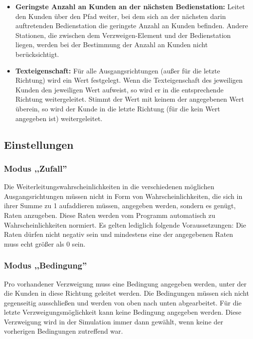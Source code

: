 \begin{itemize}
  \item 
    \textbf{Geringste Anzahl an Kunden an der nächsten Bedienstation:}
    Leitet den Kunden über den Pfad weiter, bei dem sich an der nächsten
    darin auftretenden Bedienstation die geringste Anzahl an Kunden befinden.
    Andere Stationen, die zwischen dem Verzweigen-Element und der
    Bedienstation liegen, werden bei der Bestimmung der Anzahl an Kunden
    nicht berücksichtigt.

  \item 
    \textbf{Texteigenschaft:}
    Für alle Ausgangsrichtungen (außer für die letzte Richtung) wird ein Wert festgelegt.
    Wenn die Texteigenschaft des jeweiligen Kunden den jeweiligen Wert aufweist,
    so wird er in die entsprechende Richtung weitergeleitet.
    Stimmt der Wert mit keinem der angegebenen Wert überein,
    so wird der Kunde in die letzte Richtung (für die kein Wert angegeben ist) weitergeleitet.

\end{itemize}

\subsection*{Einstellungen}

\subsubsection*{Modus ,,Zufall''}

Die Weiterleitungswahrscheinlichkeiten in die verschiedenen möglichen Ausgangsrichtungen müssen nicht in
Form von Wahrscheinlichkeiten, die sich in ihrer Summe zu 1 aufaddieren müssen, angegeben werden, sondern
es genügt, Raten anzugeben. Diese Raten werden vom Programm automatisch zu Wahrscheinlichkeiten normiert.
Es gelten lediglich folgende Voraussetzungen: Die Raten dürfen nicht negativ sein und mindestens eine der
angegebenen Raten muss echt größer als 0 sein.

\subsubsection*{Modus ,,Bedingung''}

Pro vorhandener Verzweigung muss eine Bedingung angegeben werden, unter der die Kunden in diese Richtung
geleitet werden. Die Bedingungen müssen sich nicht gegenseitig ausschließen und werden von oben nach unten
abgearbeitet. Für die letzte Verzweigungsmöglichkeit kann keine Bedingung angegeben werden. Diese Verzweigung
wird in der Simulation immer dann gewählt, wenn keine der vorherigen Bedingungen zutreffend war.

